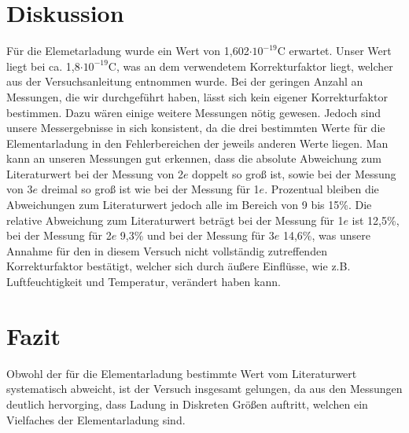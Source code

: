 \documentclass[12pt]{scrartcl}
\begin{document}
\section{Diskussion}
Für die Elemetarladung wurde ein Wert von 1,602$\cdot 10^{-19}$C erwartet. Unser Wert liegt bei ca. 1,8$\cdot 10^{-19}$C, was an dem verwendetem Korrekturfaktor liegt, welcher aus der Versuchsanleitung entnommen wurde. Bei der geringen Anzahl an Messungen, die wir durchgeführt haben, lässt sich kein eigener Korrekturfaktor bestimmen. Dazu wären einige weitere Messungen nötig gewesen. Jedoch sind unsere Messergebnisse in sich konsistent, da die drei bestimmten Werte für die Elementarladung in den Fehlerbereichen der jeweils anderen Werte liegen. Man kann an unseren Messungen gut erkennen, dass die absolute Abweichung zum Literaturwert bei der Messung von 2$e$ doppelt so groß ist, sowie bei der Messung von 3$e$ dreimal so groß ist wie bei der Messung für 1$e$. Prozentual bleiben die Abweichungen zum Literaturwert jedoch alle im Bereich von 9 bis 15\%. Die relative Abweichung zum Literaturwert beträgt bei der Messung für 1$e$ ist 12,5\%, bei der Messung für 2$e$ 9,3\% und bei der Messung für 3$e$ 14,6\%, was unsere Annahme für den in diesem Versuch nicht vollständig zutreffenden Korrekturfaktor bestätigt, welcher sich durch äußere Einflüsse, wie z.B. Luftfeuchtigkeit und Temperatur, verändert haben kann.   

\section{Fazit}
Obwohl der für die Elementarladung bestimmte Wert vom Literaturwert systematisch abweicht, ist der Versuch insgesamt gelungen, da aus den Messungen deutlich hervorging, dass Ladung in Diskreten Größen auftritt, welchen ein Vielfaches der Elementarladung sind.
\end{document}
